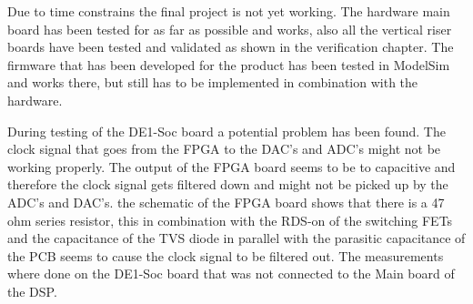 Due to time constrains the final project is not yet working. The hardware main board has been tested for as far as possible and works, also all the vertical riser boards have been tested and validated as shown in the verification chapter. The firmware that has been developed for the product has been tested in ModelSim and works there, but still has to be implemented in combination with the hardware. 
\par
\noindent During testing of the DE1-Soc board a potential problem has been found. The clock signal that goes from the FPGA to the DAC's and ADC's might not be working properly. The output of the FPGA board seems to be to capacitive and therefore the clock signal gets filtered down and might not be picked up by the ADC's and DAC's. the schematic of the FPGA board shows that there is a 47 ohm series resistor, this in combination with the RDS-on of the switching FETs and the capacitance of the TVS diode in parallel with the parasitic capacitance of the PCB seems to cause the clock signal to be filtered out. The measurements where done on the DE1-Soc board that was not connected to the Main board of the DSP. 
